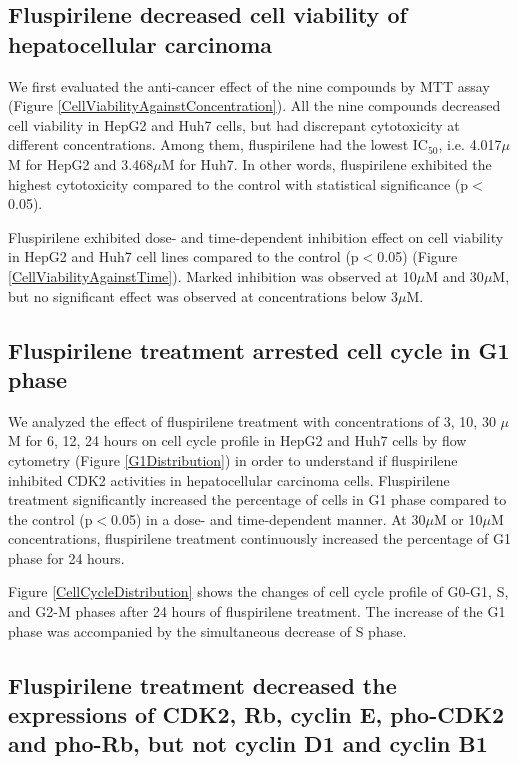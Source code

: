 \documentclass[10pt]{article}
\begin{document}
\subsection*{Fluspirilene decreased cell viability of hepatocellular carcinoma}

We first evaluated the anti-cancer effect of the nine compounds by MTT assay (Figure \ref{CellViabilityAgainstConcentration}). All the nine compounds decreased cell viability in HepG2 and Huh7 cells, but had discrepant cytotoxicity at different concentrations. Among them, fluspirilene had the lowest IC$_{50}$, i.e. 4.017$\mu$M for HepG2 and 3.468$\mu$M for Huh7. In other words, fluspirilene exhibited the highest cytotoxicity compared to the control with statistical significance (p$<$0.05).

Fluspirilene exhibited dose- and time-dependent inhibition effect on cell viability in HepG2 and Huh7 cell lines compared to the control (p$<$0.05) (Figure \ref{CellViabilityAgainstTime}). Marked inhibition was observed at 10$\mu$M and 30$\mu$M, but no significant effect was observed at concentrations below 3$\mu$M.

\subsection*{Fluspirilene treatment arrested cell cycle in G1 phase}

We analyzed the effect of fluspirilene treatment with concentrations of 3, 10, 30 $\mu$M for 6, 12, 24 hours on cell cycle profile in HepG2 and Huh7 cells by flow cytometry (Figure \ref{G1Distribution}) in order to understand if fluspirilene inhibited CDK2 activities in hepatocellular carcinoma cells. Fluspirilene treatment significantly increased the percentage of cells in G1 phase compared to the control (p$<$0.05) in a dose- and time-dependent manner. At 30$\mu$M or 10$\mu$M concentrations, fluspirilene treatment continuously increased the percentage of G1 phase for 24 hours.

Figure \ref{CellCycleDistribution} shows the changes of cell cycle profile of G0-G1, S, and G2-M phases after 24 hours of fluspirilene treatment. The increase of the G1 phase was accompanied by the simultaneous decrease of S phase.

\subsection*{Fluspirilene treatment decreased the expressions of CDK2, Rb, cyclin E, pho-CDK2 and pho-Rb, but not cyclin D1 and cyclin B1}
\end{document}
